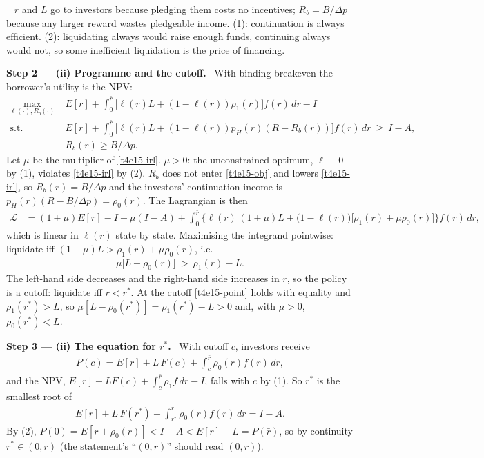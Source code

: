 \documentclass[11pt,a4paper]{article}
\newcommand{\step}[2]{\par\medskip\noindent\textbf{Step #1 --- #2.}~}
\newcommand{\answer}[1]{\par\smallskip\noindent\fbox{\textbf{Answer #1.}}~}
\begin{document}
\answer{(i)} $r$ and $L$ go to investors because pledging them costs no incentives; $R_b=B/\Delta p$
because any larger reward wastes pledgeable income. (1): continuation is always efficient. (2):
liquidating always would raise enough funds, continuing always would not, so some inefficient
liquidation is the price of financing.

\step{2}{(ii) Programme and the cutoff} With binding breakeven the borrower's utility is the NPV:
\begin{align}
  \max_{\ell(\cdot),R_b(\cdot)}\; & E[r]+\int_0^{\bar r}\big[\ell(r)L+(1-\ell(r))\rho_1(r)\big]f(r)\,dr-I \label{t4e15-obj}\\
  \text{s.t. }\; & E[r]+\int_0^{\bar r}\big[\ell(r)L+(1-\ell(r))p_H(r)(R-R_b(r))\big]f(r)\,dr\ \ge\ I-A, \label{t4e15-irl}\\
  & R_b(r)\ge B/\Delta p. \label{t4e15-ic}
\end{align}
Let $\mu$ be the multiplier of \eqref{t4e15-irl}. $\mu>0$: the unconstrained optimum, $\ell\equiv0$ by (1),
violates \eqref{t4e15-irl} by (2). $R_b$ does not enter \eqref{t4e15-obj} and lowers \eqref{t4e15-irl}, so
$R_b(r)=B/\Delta p$ and the investors' continuation income is $p_H(r)(R-B/\Delta p)=\rho_0(r)$. The
Lagrangian is then
\begin{align}
  \mathcal L &= (1+\mu)E[r]-I-\mu(I-A)+\int_0^{\bar r}\Big\{\ell(r)\,(1+\mu)L
               +\big(1-\ell(r)\big)\big[\rho_1(r)+\mu\rho_0(r)\big]\Big\}f(r)\,dr, \nonumber
\end{align}
which is linear in $\ell(r)$ state by state. Maximising the integrand pointwise: liquidate iff
$(1+\mu)L>\rho_1(r)+\mu\rho_0(r)$, i.e.
\begin{align}
  \mu\big[L-\rho_0(r)\big]\ >\ \rho_1(r)-L. \label{t4e15-point}
\end{align}
The left-hand side decreases and the right-hand side increases in $r$, so the policy is a cutoff:
liquidate iff $r<r^*$. At the cutoff \eqref{t4e15-point} holds with equality and $\rho_1(r^*)>L$, so
$\mu[L-\rho_0(r^*)]=\rho_1(r^*)-L>0$ and, with $\mu>0$, $\rho_0(r^*)<L$.

\step{3}{(ii) The equation for $r^*$} With cutoff $c$, investors receive
\begin{align}
  P(c)=E[r]+L\,F(c)+\int_c^{\bar r}\rho_0(r)f(r)\,dr, \label{t4e15-P}
\end{align}
and the NPV, $E[r]+LF(c)+\int_c^{\bar r}\rho_1f\,dr-I$, falls with $c$ by (1). So $r^*$ is the smallest
root of
\begin{align}
  E[r]+L\,F(r^*)+\int_{r^*}^{\bar r}\rho_0(r)f(r)\,dr = I-A. \label{t4e15-rstar}
\end{align}
By (2), $P(0)=E[r+\rho_0(r)]<I-A<E[r]+L=P(\bar r)$, so by continuity $r^*\in(0,\bar r)$ (the
statement's ``$(0,r)$'' should read $(0,\bar r)$).
\end{document}
